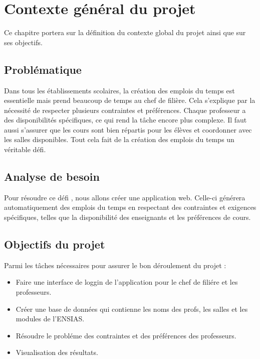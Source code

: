 \chapter{Contexte général du projet}
\label{chap:Contexte général du projet}
Ce chapitre portera sur la définition du contexte global du projet ainsi que sur ses objectifs.
\newpage
\section{Problématique}
Dans tous les établissements scolaires, la création des emplois du temps est essentielle mais prend beaucoup de temps au chef de filière. Cela s'explique par la nécessité de respecter plusieurs contraintes et préférences. Chaque professeur a des disponibilités spécifiques, ce qui rend la tâche encore plus complexe. Il faut aussi s'assurer que les cours sont bien répartis pour les élèves et coordonner avec les salles disponibles. Tout cela fait de la création des emplois du temps un véritable défi.
\section{Analyse de besoin}
Pour résoudre ce défi , nous allons créer une application web. Celle-ci générera automatiquement des emplois du temps en respectant des contraintes et exigences spécifiques, telles que la disponibilité des enseignants et les préférences de cours. 
\section{Objectifs du projet}
Parmi les tâches nécessaires pour assurer le bon déroulement du projet :
\begin{itemize}
\item Faire une interface de loggin de l'application pour le chef de filiére et les professeurs.
\item Créer une base de données qui contienne les noms des profs, les salles et les modules de l'ENSIAS.
\item Résoudre le probléme des contraintes et des préférences des professeurs.
\item Visualisation des résultats.
\end{itemize}
